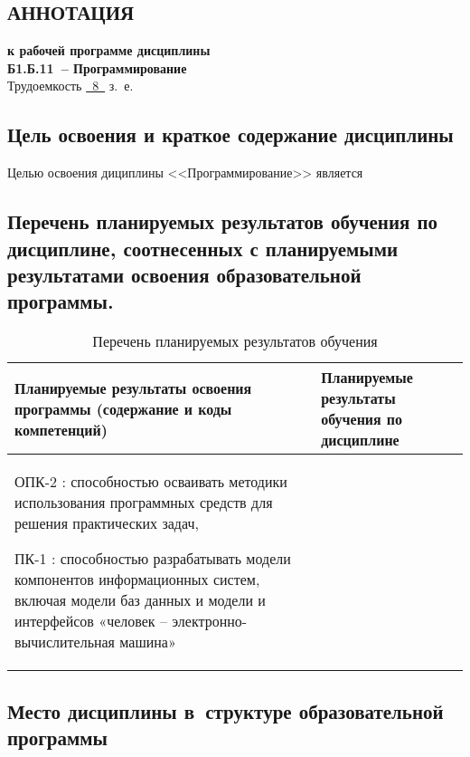 \documentclass[a4paper,12pt]{article}
\begin{document}
\newpage


\begin{center}
\section{АННОТАЦИЯ}
{\bf к рабочей программе дисциплины\\
Б1.Б.11\ -- Программирование} \\
Трудоемкость \uline{~8~} з.~е.
\end{center}


\subsection{Цель освоения и краткое содержание дисциплины}
Целью освоения дициплины <<Программирование>> является


\subsection{Перечень планируемых результатов обучения по дисциплине, соотнесенных с планируемыми результатами освоения образовательной программы.}
\begin{longtable}{|p{8cm}|p{8cm}|}
\caption{Перечень планируемых результатов обучения}\\
\hline
\centering
Планируемые результаты освоения программы (содержание и коды компетенций) & 
\centering\arraybackslash
Планируемые результаты обучения по дисциплине
\\
\hline

ОПК-2 : способностью осваивать методики использования программных средств для решения практических задач, 

ПК-1 : способностью разрабатывать модели компонентов информационных систем, включая модели баз данных и модели и интерфейсов «человек – электронно-вычислительная машина»

& \\
\hline
\end{longtable}


\subsection{Место дисциплины в~структуре образовательной программы}
\end{document}

